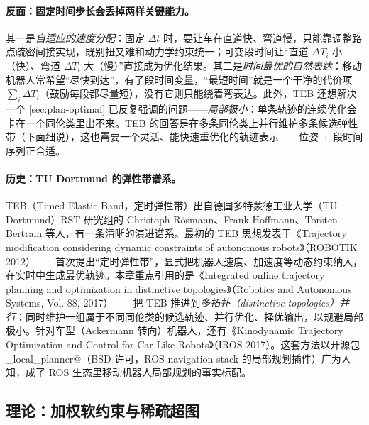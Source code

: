 \paragraph{反面：固定时间步长会丢掉两样关键能力。}
其一是\emph{自适应的速度分配}：固定 $\Delta t$ 时，要让车在直道快、弯道慢，只能靠调整路点疏密间接实现，既别扭又难和动力学约束统一；可变段时间让“直道 $\Delta T_i$ 小（快）、弯道 $\Delta T_i$ 大（慢）”直接成为优化结果。其二是\emph{时间最优的自然表达}：移动机器人常希望“尽快到达”，有了段时间变量，“最短时间”就是一个干净的代价项 $\sum_i\Delta T_i$（鼓励每段都尽量短），没有它则只能绕着弯表达。此外，TEB 还想解决一个 \cref{sec:plan-optimal} 已反复强调的问题——\emph{局部极小}：单条轨迹的连续优化会卡在一个同伦类里出不来。TEB 的回答是在多条同伦类上并行维护多条候选弹性带（下面细说），这也需要一个灵活、能快速重优化的轨迹表示——位姿 + 段时间序列正合适。

\paragraph{历史：TU Dortmund 的弹性带谱系。}
TEB（Timed Elastic Band，定时弹性带）出自德国多特蒙德工业大学（TU Dortmund）RST 研究组的 Christoph Rösmann、Frank Hoffmann、Torsten Bertram 等人，有一条清晰的演进谱系。最初的 TEB 思想发表于《Trajectory modification considering dynamic constraints of autonomous robots》（ROBOTIK 2012）——首次提出“定时弹性带”，显式把机器人速度、加速度等动态约束纳入，在实时中生成最优轨迹\cite{rosmann2012teb}。本章重点引用的是《Integrated online trajectory planning and optimization in distinctive topologies》（Robotics and Autonomous Systems, Vol. 88, 2017）——把 TEB 推进到\emph{多拓扑（distinctive topologies）并行}：同时维护一组属于不同同伦类的候选轨迹、并行优化、择优输出，以规避局部极小\cite{rosmann2017teb}。针对车型（Ackermann 转向）机器人，还有《Kinodynamic Trajectory Optimization and Control for Car-Like Robots》（IROS 2017）\cite{rosmann2017carlike}。这套方法以开源包 \verb@teb_local_planner@（BSD 许可，ROS navigation stack 的局部规划插件）广为人知，成了 ROS 生态里移动机器人局部规划的事实标配。

\subsection{理论：加权软约束与稀疏超图}
\label{sec:st-teb-theory}


